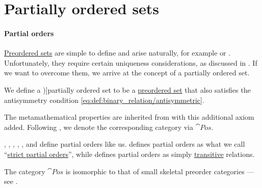 \section{Partially ordered sets}\label{sec:partially_ordered_sets}

\paragraph{Partial orders}

\hyperref[def:preordered_set]{Preordered sets} are simple to define and arise naturally, for example  or . Unfortunately, they require certain uniqueness considerations, as discussed in . If we want to overcome them, we arrive at the concept of a partially ordered set.

\begin{definition}\label{def:partially_ordered_set}
  We define a \term[ru=частично упорядоченное множество (\cite[72]{Гуров2013ТеорияРешёток})]{partially ordered set} to be a \hyperref[def:preordered_set]{preordered set} that also satisfies the antisymmetry condition \eqref{eq:def:binary_relation/antisymmetric}.

  The metamathematical properties are inherited from  with this additional axiom added. Following , we denote the corresponding category via \( \cat{Pos} \).
\end{definition}
\begin{comments}
  \item {}, , , , ,  and  define partial orders like us.  defines partial orders as what we call \enquote{\hyperref[def:strict_partial_order]{strict partial orders}}, while  defines partial orders as simply \hyperref[def:binary_relation/transitive]{transitive} relations.

  \item The category \( \cat{Pos} \) is isomorphic to that of small skeletal preorder categories --- see .
\end{comments}

